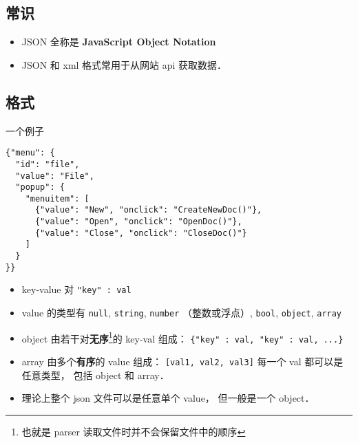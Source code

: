 
\begin{issues}
\issueDraft
\end{issues}

\subsection{常识}
\begin{itemize}
\item JSON 全称是 \textbf{JavaScript Object Notation}
\item JSON 和 xml 格式常用于从网站 api 获取数据．
\end{itemize}

\subsection{格式}
一个例子
\begin{lstlisting}[language=none]
{"menu": {
  "id": "file",
  "value": "File",
  "popup": {
    "menuitem": [
      {"value": "New", "onclick": "CreateNewDoc()"},
      {"value": "Open", "onclick": "OpenDoc()"},
      {"value": "Close", "onclick": "CloseDoc()"}
    ]
  }
}}
\end{lstlisting}

\begin{itemize}
\item key-value 对 \verb|"key" : val|
\item value 的类型有 \verb|null|, \verb|string|, \verb|number| （整数或浮点）, \verb|bool|, \verb|object|, \verb|array|
\item object 由若干对\textbf{无序}\footnote{也就是 parser 读取文件时并不会保留文件中的顺序}的 key-val 组成： \verb|{"key" : val, "key" : val, ...}|
\item array 由多个\textbf{有序}的 value 组成： \verb|[val1, val2, val3]| 每一个 val 都可以是任意类型， 包括 object 和 array．
\item 理论上整个 json 文件可以是任意单个 value， 但一般是一个 object．
\end{itemize}
